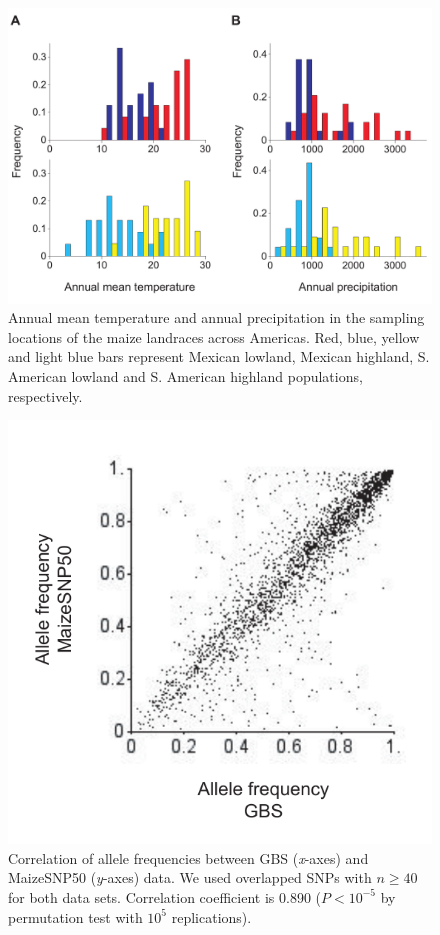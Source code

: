 \renewcommand{\arraystretch}{1}

\begin{figure}[h]
  \begin{center}
    \includegraphics[width=0.5\columnwidth]{fig/bioclm.pdf}
    \caption{Annual mean temperature and annual precipitation in the sampling locations of the maize landraces across Americas.
    Red, blue, yellow and light blue bars represent Mexican lowland, Mexican highland, S. American lowland and S. American highland
    populations, respectively.  
    }
    \label{supp:colfreq}
  \end{center}
\end{figure}

\begin{figure}[h]
  \begin{center}
    \includegraphics[width=0.4\columnwidth]{fig/Col.pdf}
    \caption{Correlation of allele frequencies between GBS (\emph{x}-axes) and MaizeSNP50 (\emph{y}-axes) data.  We used overlapped SNPs with $n\geq40$ for both data sets.  Correlation coefficient is 0.890 ($P<10^{-5}$ by permutation test with $10^5$ replications).}
    \label{supp:correl_freq}
  \end{center}
\end{figure}

